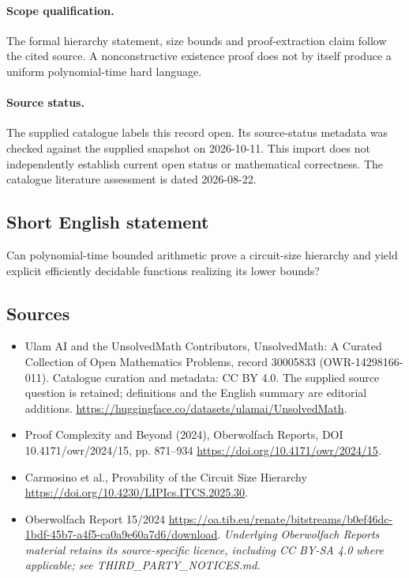 \documentclass[11pt]{article}
\begin{document}
\paragraph{Scope qualification.}
The formal hierarchy statement, size bounds and proof-extraction claim follow the cited source. A nonconstructive existence proof does not by itself produce a uniform polynomial-time hard language.
\paragraph{Source status.}
The supplied catalogue labels this record open. Its source-status metadata was checked against the supplied snapshot on 2026-10-11. This import does not independently establish current open status or mathematical correctness. The catalogue literature assessment is dated 2026-08-22.
\subsection{Short English statement}
Can polynomial-time bounded arithmetic prove a circuit-size hierarchy and yield explicit efficiently decidable functions realizing its lower bounds?
\subsection{Sources}
\begin{itemize}
\item[S1] Ulam AI and the UnsolvedMath Contributors, UnsolvedMath: A Curated Collection of Open Mathematics Problems, record 30005833 (OWR-14298166-011). Catalogue curation and metadata: CC BY 4.0. The supplied source question is retained; definitions and the English summary are editorial additions.
\url{https://huggingface.co/datasets/ulamai/UnsolvedMath}.
\item[S2] Proof Complexity and Beyond (2024), Oberwolfach Reports, DOI 10.4171/owr/2024/15, pp. 871--934
\url{https://doi.org/10.4171/owr/2024/15}.
\item[S3] Carmosino et al., Provability of the Circuit Size Hierarchy
\url{https://doi.org/10.4230/LIPIcs.ITCS.2025.30}.
\item[S4] Oberwolfach Report 15/2024
\url{https://oa.tib.eu/renate/bitstreams/b0ef46dc-1bdf-45b7-a4f5-ca0a9e60a7d6/download}.
\textit{Underlying Oberwolfach Reports material retains its source-specific licence, including CC BY-SA 4.0 where applicable; see THIRD\_PARTY\_NOTICES.md.}
\end{itemize}
\end{document}
